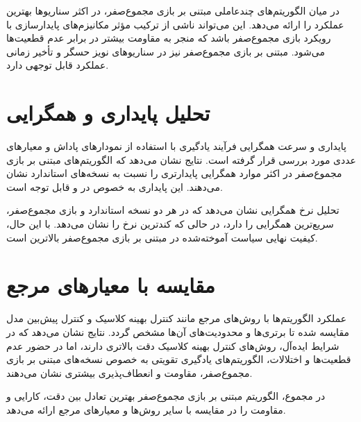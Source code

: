 در میان الگوریتم‌های چندعاملی مبتنی بر بازی مجموع‌صفر،  در اکثر سناریوها بهترین عملکرد را ارائه می‌دهد. این می‌تواند ناشی از ترکیب مؤثر مکانیزم‌های پایدارسازی  با رویکرد بازی مجموع‌صفر باشد که منجر به مقاومت بیشتر در برابر عدم قطعیت‌ها می‌شود.  مبتنی بر بازی مجموع‌صفر نیز در سناریوهای نویز حسگر و تأخیر زمانی عملکرد قابل توجهی دارد.

\section{تحلیل پایداری و همگرایی}

پایداری و سرعت همگرایی فرآیند یادگیری با استفاده از نمودارهای پاداش و معیارهای عددی مورد بررسی قرار گرفته است. نتایج نشان می‌دهد که الگوریتم‌های مبتنی بر بازی مجموع‌صفر در اکثر موارد همگرایی پایدارتری را نسبت به نسخه‌های استاندارد نشان می‌دهند. این پایداری به خصوص در  و  قابل توجه است.

تحلیل نرخ همگرایی نشان می‌دهد که  در هر دو نسخه استاندارد و بازی مجموع‌صفر، سریع‌ترین همگرایی را دارد، در حالی که  کندترین نرخ را نشان می‌دهد. با این حال، کیفیت نهایی سیاست آموخته‌شده در  مبتنی بر بازی مجموع‌صفر بالاترین است.

\section{مقایسه با معیارهای مرجع}

عملکرد الگوریتم‌ها با روش‌های مرجع مانند کنترل بهینه کلاسیک و کنترل پیش‌بین مدل مقایسه شده تا برتری‌ها و محدودیت‌های آن‌ها مشخص گردد. نتایج نشان می‌دهد که در شرایط ایده‌آل، روش‌های کنترل بهینه کلاسیک دقت بالاتری دارند، اما در حضور عدم قطعیت‌ها و اختلالات، الگوریتم‌های یادگیری تقویتی به خصوص نسخه‌های مبتنی بر بازی مجموع‌صفر، مقاومت و انعطاف‌پذیری بیشتری نشان می‌دهند.

در مجموع، الگوریتم  مبتنی بر بازی مجموع‌صفر بهترین تعادل بین دقت، کارایی و مقاومت را در مقایسه با سایر روش‌ها و معیارهای مرجع ارائه می‌دهد.